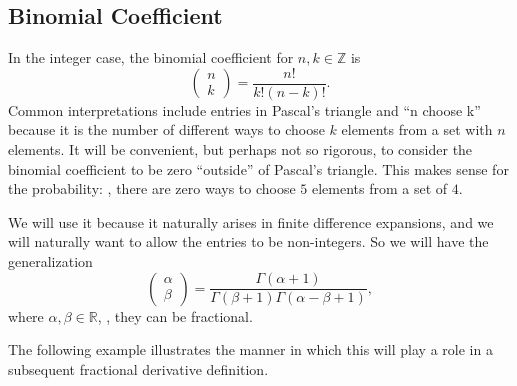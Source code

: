     \subsection{Binomial Coefficient}
    In the integer case, the binomial coefficient for $n,k \in \mathbb Z$ is
    \begin{equation}
      \left( \begin{array}{c} n \\ k \end{array} \right) = \frac{n!}{k!\left(n-k\right)!}.
      \label{eq:binomialint}
    \end{equation}
    Common interpretations include entries in Pascal's triangle and ``n choose k'' because it is the number of different ways to choose $k$ elements from a set with $n$ elements. It will be convenient, but perhaps not so rigorous, to consider the binomial coefficient to be zero ``outside'' of Pascal's triangle. This makes sense for the probability: \eg, there are zero ways to choose $5$ elements from a set of $4$.

    We will use it because it naturally arises in finite difference expansions, and we will naturally want to allow the entries to be non-integers. So we will have the generalization
    \begin{equation}
      \left( \begin{array}{c} \alpha \\ \beta \end{array} \right) = \frac{\Gamma\left(\alpha+1\right)}{\Gamma\left(\beta + 1 \right) \Gamma \left(\alpha - \beta + 1\right)},
      \label{eq:binomialfrac}
    \end{equation}
    where $\alpha, \beta \in \mathbb R$, \ie, they can be fractional.

    The following example illustrates the manner in which this will play a role in a subsequent fractional derivative definition.

